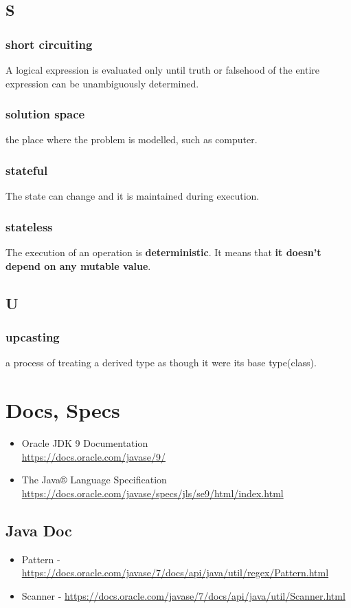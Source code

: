 \documentclass{report}
\begin{document}
\section{S}

\subsection{short circuiting}
A logical expression is evaluated only until truth or falsehood of the entire expression can be unambiguously determined.

\subsection{solution space}
the place where the problem is modelled, such as computer.

\subsection{stateful}
The state can change and it is maintained during execution.

\subsection{stateless}
The execution of an operation is \textbf{deterministic}. It means that
\textbf{it doesn't depend on any mutable value}.


\section{U}

\subsection{upcasting}
a process of treating a derived type as though it were its base type(class).



\chapter{Docs, Specs}
\begin{itemize}
\item Oracle JDK 9 Documentation\\
\url{https://docs.oracle.com/javase/9/}
\item The Java® Language Specification\\
\url{https://docs.oracle.com/javase/specs/jls/se9/html/index.html}
\end{itemize}


\section{Java Doc}
\begin{itemize}
\item Pattern - \url{https://docs.oracle.com/javase/7/docs/api/java/util/regex/Pattern.html}
\item Scanner - \url{https://docs.oracle.com/javase/7/docs/api/java/util/Scanner.html}
\end{itemize}
\end{document}
